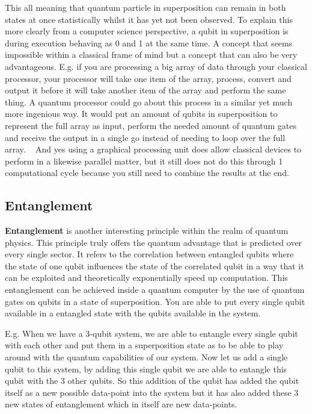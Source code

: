 This all meaning that quantum particle in superposition can remain in both states at once statistically whilst it has yet not been observed. To explain this more clearly from a computer science perspective, a qubit in superposition is during execution behaving as 0 and 1 at the same time. A concept that seems impossible within a classical frame of mind but a concept that can also be very advantageous. E.g. if you are processing a big array of data through your classical processor, your processor will take one item of the array, process, convert and output it before it will take another item of the array and perform the same thing. A quantum processor could go about this process in a similar yet much more ingenious way. It would put an amount of qubits in superposition to represent the full array as input, perform the needed amount of quantum gates and receive the output in a single go instead of needing to loop over the full array. ~\autocite{Draper2000} And yes using a graphical processing unit does allow classical devices to perform in a likewise parallel matter, but it still does not do this through 1 computational cycle because you still need to combine the results at the end.

\subsection{Entanglement}
\textbf{Entanglement} is another interesting principle within the realm of quantum physics. This principle truly offers the quantum advantage that is predicted over every single sector. 
It refers to the correlation between entangled qubits where the state of one qubit influences the state of the correlated qubit in a way that it can be exploited and theoretically exponentially speed up computation. This entanglement can be achieved inside a quantum computer by the use of quantum gates on qubits in a state of superposition. You are able to put every single qubit available in a entangled state with the qubits available in the system. 

E.g. When we have a 3-qubit system, we are able to entangle every single qubit with each other and put them in a superposition state as to be able to play around with the quantum capabilities of our system. Now let us add a single qubit to this system, by adding this single qubit we are able to entangle this qubit with the 3 other qubits. So this addition of the qubit has added the qubit itself as a new possible data-point into the system but it has also added these 3 new states of entanglement which in itself are new data-points. 

